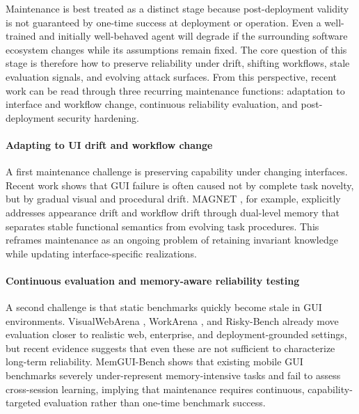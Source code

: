 Maintenance is best treated as a distinct stage because post-deployment validity is not guaranteed by one-time success at deployment or operation. Even a well-trained and initially well-behaved agent will degrade if the surrounding software ecosystem changes while its assumptions remain fixed. The core question of this stage is therefore how to preserve reliability under drift, shifting workflows, stale evaluation signals, and evolving attack surfaces. From this perspective, recent work can be read through three recurring maintenance functions: adaptation to interface and workflow change, continuous reliability evaluation, and post-deployment security hardening.

\paragraph{Adapting to UI drift and workflow change}
A first maintenance challenge is preserving capability under changing interfaces. Recent work shows that GUI failure is often caused not by complete task novelty, but by gradual visual and procedural drift. MAGNET \cite{sun2026magnet}, for example, explicitly addresses appearance drift and workflow drift through dual-level memory that separates stable functional semantics from evolving task procedures. This reframes maintenance as an ongoing problem of retaining invariant knowledge while updating interface-specific realizations.

\paragraph{Continuous evaluation and memory-aware reliability testing}
A second challenge is that static benchmarks quickly become stale in GUI environments. VisualWebArena \cite{koh2024visualwebarena}, WorkArena \cite{drouin2024workarena}, and Risky-Bench \cite{zheng2026riskybench} already move evaluation closer to realistic web, enterprise, and deployment-grounded settings, but recent evidence suggests that even these are not sufficient to characterize long-term reliability. MemGUI-Bench \cite{liu2026memgui} shows that existing mobile GUI benchmarks severely under-represent memory-intensive tasks and fail to assess cross-session learning, implying that maintenance requires continuous, capability-targeted evaluation rather than one-time benchmark success.

